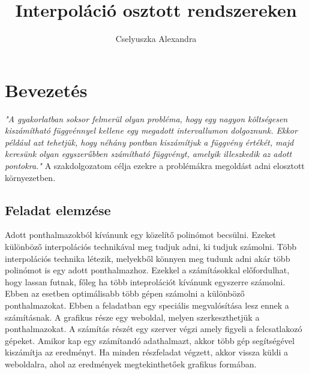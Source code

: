 \documentclass{elteikthesis}
\title{Interpoláció osztott rendszereken}
\author{Cselyuszka Alexandra}
\begin{document}
\frontmatter

	\maketitle

\mainmatter

\tableofcontents
	
\chapter{Bevezetés} 

\textit{
"A gyakorlatban soksor felmerül olyan probléma, hogy egy nagyon költségesen kiszámítható függvénnyel kellene egy megadott intervallumon dolgoznunk. Ekkor például azt tehetjük, hogy néhány pontban kiszámítjuk a függvény értékét, majd keresünk olyan egyszerűbben számítható függvényt, amelyik illeszkedik az adott pontokra." 	}
\cite{numanalbev}
\newline
\newline
A szakdolgozatom célja ezekre a problémákra megoldást adni elosztott környezetben. 
\section{Feladat elemzése}
Adott ponthalmazokból kívánunk egy közelítő polinómot becsülni. Ezeket különböző interpolációs technikával meg tudjuk adni, ki tudjuk számolni. Több interpolációs technika létezik, melyekből könnyen meg tudunk adni akár több polinómot is egy adott ponthalmazhoz.\newline
Ezekkel a számításokkal előfordulhat, hogy lassan futnak, főleg ha több inteprolációt kívánunk egyszerre számolni.
Ebben az esetben optimálisabb több gépen számolni a különböző ponthalmazokat.
\newline\newline
Ebben a feladatban egy speciális megvalósítása lesz ennek a számításnak. \newline
A grafikus része egy weboldal, melyen szerkeszthetjük a ponthalmazokat. A számítás részét egy szerver végzi amely figyeli a felcsatlakozó gépeket. Amikor kap egy számítandó adathalmazt, akkor több gép segítségével kiszámítja az eredményt. Ha minden részfeladat végzett, akkor vissza küldi a weboldalra, ahol az eredmények megtekinthetőek grafikus formában.
\newline\newline
\end{document}
